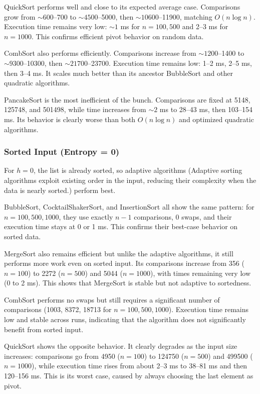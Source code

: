 \documentclass{article}
\begin{document}
QuickSort performs well and close to its expected average case. Comparisons grow from $\sim 600$--700 to $\sim 4500$--5000, then $\sim 10600$--11900, matching $O(n \log n)$. Execution time remains very low: $\sim 1$ ms for $n=100,500$ and 2--3 ms for $n=1000$. This confirms efficient pivot behavior on random data.

CombSort also performs efficiently. Comparisons increase from $\sim 1200$--1400 to $\sim 9300$--10300, then $\sim 21700$--23700. Execution time remains low: 1--2 ms, 2--5 ms, then 3--4 ms. It scales much better than its ancestor BubbleSort and other quadratic algorithms.

PancakeSort is the most inefficient of the bunch. Comparisons are fixed at 5148, 125748, and 501498, while time increases from $\sim 2$ ms to 28--43 ms, then 103--154 ms. Its behavior is clearly worse than both $O(n \log n)$ and optimized quadratic algorithms.

\subsubsection{Sorted Input (Entropy = 0)}

For $h=0$, the list is already sorted, so adaptive algorithms (Adaptive sorting algorithms exploit existing order in the input, reducing their complexity when the data is nearly sorted.) perform best.

BubbleSort, CocktailShakerSort, and InsertionSort all show the same pattern: for $n=100,500,1000$, they use exactly $n-1$ comparisons, 0 swaps, and their execution time stays at 0 or 1 ms. This confirms their best-case behavior on sorted data.

MergeSort also remains efficient but unlike the adaptive algorithms, it still performs more work even on sorted input. Its comparisons increase from 356 ($n=100$) to 2272 ($n=500$) and 5044 ($n=1000$), with times remaining very low (0 to 2 ms). This shows that MergeSort is stable but not adaptive to sortedness.

CombSort performs no swaps but still requires a significant number of comparisons (1003, 8372, 18713 for $n=100,500,1000$). Execution time remains low and stable across runs, indicating that the algorithm does not significantly benefit from sorted input.

QuickSort shows the opposite behavior. It clearly degrades as the input size increases: comparisons go from 4950 ($n=100$) to 124750 ($n=500$) and 499500 ($n=1000$), while execution time rises from about 2--3 ms to 38--81 ms and then 120--156 ms. This is its worst case, caused by always choosing the last element as pivot.
\end{document}

